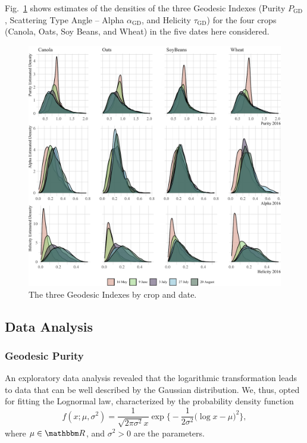 \documentclass[journal]{IEEEtran}
\begin{document}
Fig.~\ref{fig:AllIndexes} shows estimates of the densities of the three Geodesic Indexes (Purity $P_{\text{GD}}$, Scattering Type Angle -- Alpha $\alpha_{\text{GD}}$, and Helicity $\tau_{\text{GD}}$) for the four crops (Canola, Oats, Soy Beans, and Wheat) in the five dates here considered.

\begin{figure}[htb]
\centering
\includegraphics[width=\linewidth]{Indexes}
\caption{The three Geodesic Indexes by crop and date.}\label{fig:AllIndexes}
\end{figure}

\subsection{Data Analysis}

\subsubsection{Geodesic Purity}

An exploratory data analysis revealed that the logarithmic transformation leads to data that can be well described by the Gaussian distribution.
We, thus, opted for fitting the Lognormal law, characterized by the probability density function
\begin{equation}
f(x;\mu,\sigma^2) = \frac{1}{\sqrt{2\pi\sigma^2} x} \exp\Big\{
-\frac1{2 \sigma^2}\big(\log x - \mu\big)^2
\Big\},
\end{equation}
where $\mu\in\mathbbm R$, and $\sigma^2>0$ are the parameters.
\end{document}
